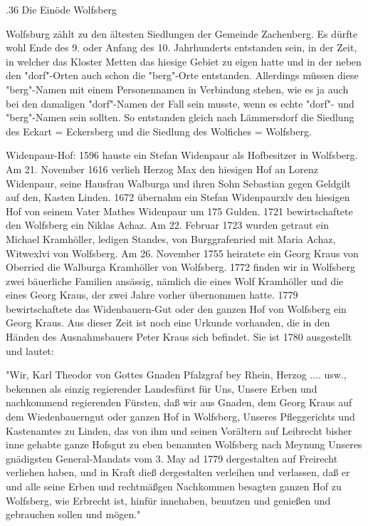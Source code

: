 .36 Die Einöde Wolfsberg

Wolfsburg zählt zu den ältesten Siedlungen der Gemeinde Zachenberg. Es dürfte
wohl Ende des 9. oder Anfang des 10. Jahrhunderts entstanden sein, in der Zeit,
in welcher das Kloster Metten das hiesige Gebiet zu eigen hatte und in der neben
den "dorf"-Orten auch schon die "berg"-Orte entstanden. Allerdings müssen diese
"berg"-Namen mit einem Personennamen in Verbindung stehen, wie es ja auch bei
den damaligen "dorf"-Namen der Fall sein musste, wenn es echte "dorf"- und
"berg"-Namen sein sollten. So entstanden gleich nach Lämmersdorf die Siedlung
des Eckart = Eckersberg und die Siedlung des Wolfiches = Wolfsberg.

Widenpaur-Hof: 1596 hauste ein Stefan Widenpaur als Hofbesitzer in Wolfsberg. Am
21. November 1616 verlieh Herzog Max den hiesigen Hof an Lorenz Widenpaur, seine
Hausfrau Walburga und ihren Sohn Sebastian gegen Geldgilt auf den, Kasten
Linden. 1672 übernahm ein Stefan Widenpaurxlv den hiesigen Hof von seinem Vater
Mathes Widenpaur um 175 Gulden. 1721 bewirtschaftete den Wolfsberg ein Niklas
Achaz. Am 22. Februar 1723 wurden getraut ein Michael Kramhöller, ledigen
Standes, von Burggrafenried mit Maria Achaz, Witwexlvi von Wolfsberg. Am 26.
November 1755 heiratete ein Georg Kraus von Oberried die Walburga Kramhöller von
Wolfsberg. 1772 finden wir in Wolfsberg zwei bäuerliche Familien ansässig,
nämlich die eines Wolf Kramhöller und die eines Georg Kraus, der zwei Jahre
vorher übernommen hatte. 1779 bewirtschaftete das Widenbauern-Gut oder den
ganzen Hof von Wolfsberg ein Georg Kraus. Aus dieser Zeit ist noch eine Urkunde
vorhanden, die in den Händen des Ausnahmsbauers Peter Kraus sich befindet. Sie
ist 1780 ausgestellt und lautet:

"Wir, Karl Theodor von Gottes Gnaden Pfalzgraf bey Rhein, Herzog .... usw.,
bekennen als einzig regierender Landesfürst für Uns, Unsere Erben und
nachkommend regierenden Fürsten, daß wir aus Gnaden, dem Georg Kraus auf dem
Wiedenbauerngut oder ganzen Hof in Wolfsberg, Unseres Pfleggerichts und
Kastenamtes zu Linden, das von ihm und seinen Vorältern auf Leibrecht bisher
inne gehabte ganze Hofsgut zu eben benannten Wolfsberg nach Meynung Unseres
gnädigsten General-Mandats vom 3. May ad 1779 dergestalten auf Freirecht
verliehen haben, und in Kraft dieß dergestalten verleihen und verlassen, daß er
und alle seine Erben und rechtmäßgen Nachkommen besagten ganzen Hof zu
Wolfsberg, wie Erbrecht ist, hinfür innehaben, benutzen und genießen und
gebrauchen sollen und mögen."


